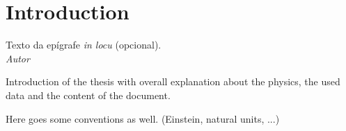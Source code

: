\chapter*{Introduction}

\begin{epigrafeonline}
\hfill Texto da epígrafe \textit{in locu} (opcional).\\
\hspace*{\fill}\textit{Autor}\\
\end{epigrafeonline}

Introduction of the thesis with overall explanation about the physics, the used data and the content of the document.

Here goes some conventions as well. (Einstein, natural units, ...)